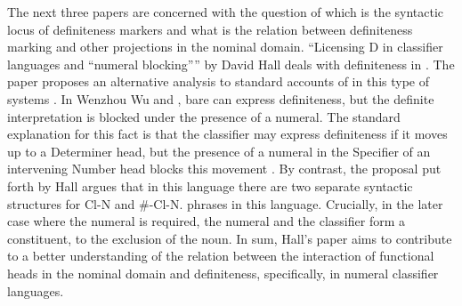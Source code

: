 \documentclass[output=paper]{langsci/langscibook}
\begin{document}
The next three papers are concerned with the question of which is the syntactic locus of definiteness markers and what is the relation between definiteness marking and other projections in the nominal domain. “Licensing D in classifier languages and ``numeral blocking''” by David Hall deals with definiteness in . The paper proposes an alternative analysis to standard accounts of  in this type of systems \citep{ChengSybesma1999,Simpson2005}. In Wenzhou Wu and , bare  can express definiteness, but the definite interpretation is blocked under the presence of a numeral. The standard explanation for this fact is that the classifier may express definiteness if it moves up to a Determiner head, but the presence of a numeral in the Specifier of an intervening Number head blocks this movement \citep{Simpson2005}. By contrast, the proposal put forth by Hall argues that in this language there are two separate syntactic structures for Cl-N and \#-Cl-N. phrases in this language. Crucially, in the later case where the numeral is required, the numeral and the classifier form a constituent, to the exclusion of the noun. In sum, Hall’s paper aims to contribute to a better understanding of the relation between the interaction of functional heads in the nominal domain and definiteness, specifically, in numeral classifier languages. 
\end{document}
